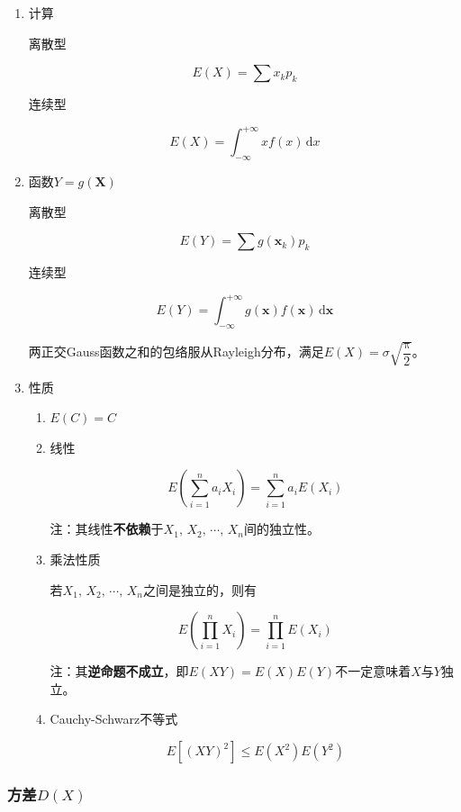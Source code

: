 \documentclass[UTF8,fontset=fandol,zihao=5]{ctexart}
\newcommand{\dd}{\,\mathrm{d}}
\newcommand{\vect}[1]{\bm{#1}}
\begin{document}
\begin{enumerate}
  \item 计算
  
  离散型

  \[
  E(X) = \sum x_k p_k
  \]

  连续型

  \[
  E(X) = \int_{-\infty}^{+\infty} x f(x)\dd x
  \]

  \item 函数$Y=g(\vect{X})$
  
  离散型

  \[
  E(Y) = \sum g(\vect x_k) p_k  
  \]

  连续型

  \[
  E(Y) = \int_{-\infty}^{+\infty} g(\vect x) f(\vect x)\dd \vect x
  \]

  \begin{methodbox}
  两正交Gauss函数之和的包络服从Rayleigh分布，满足$E(X)=\sigma\sqrt{\dfrac{\uppi}{2}}$。
  \end{methodbox}

  \item 性质
  \begin{enumerate}[label=(\arabic*)]
    \item $E(C)=C$
    
    \item 线性
    
    \[
    E\left(\sum_{i=1}^{n}a_i X_i\right)=\sum_{i=1}^{n}a_i E(X_i)
    \]
    
    注：其线性\textbf{不依赖}于$X_1,\,X_2,\,\cdots,\,X_n$间的独立性。

    \item 乘法性质
    
    若$X_1,\,X_2,\,\cdots,\,X_n$之间是独立的，则有

    \[
    E\left(\prod_{i=1}^{n}X_i\right)=\prod_{i=1}^{n}E(X_i)
    \]

    注：其\textbf{逆命题不成立}，即$E(XY)=E(X)E(Y)$不一定意味着$X$与$Y$独立。

    \item Cauchy-Schwarz不等式
    
    \[
    E[(XY)^2] \leq E(X^2)E(Y^2)
    \]
  \end{enumerate}
\end{enumerate}

\subsubsection{方差$D(X)$}
\end{document}
